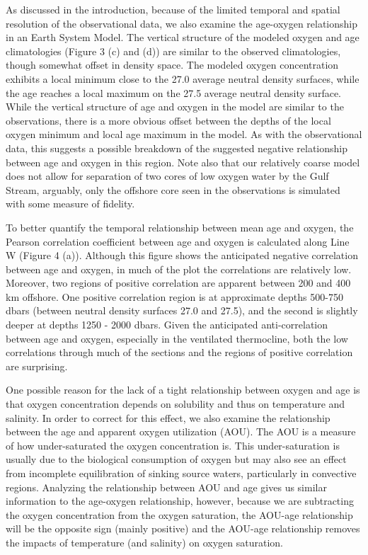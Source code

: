 As discussed in the introduction, because of the limited temporal and spatial resolution of the observational data, we also examine the age-oxygen relationship in an Earth System Model. The vertical structure of the modeled oxygen and age climatologies (Figure 3 (c) and (d)) are similar to the observed climatologies, though somewhat offset in density space. The modeled oxygen concentration exhibits a local minimum close to the 27.0 average neutral density surfaces, while the age reaches a local maximum on the 27.5 average neutral density surface. While the vertical structure of age and oxygen in the model are similar to the observations, there is a more obvious offset between the depths of the local oxygen minimum and local age maximum in the model. As with the observational data, this suggests a possible breakdown of the suggested negative relationship between age and oxygen in this region. Note also that our relatively coarse model does not allow for separation of two cores of low oxygen water by the Gulf Stream, arguably, only the offshore core seen in the observations is simulated with some measure of fidelity.

To better quantify the temporal relationship between mean age and oxygen, the Pearson correlation coefficient between age and oxygen is calculated along Line W (Figure 4 (a)).  Although this figure shows the anticipated negative correlation between age and oxygen, in much of the plot the correlations are relatively low.  Moreover, two regions of positive correlation are apparent between 200 and 400 km offshore. One positive correlation region is at approximate depths 500-750 dbars (between neutral density surfaces 27.0 and 27.5), and the second is slightly deeper at depths 1250 - 2000 dbars. Given the anticipated anti-correlation between age and oxygen, especially in the ventilated thermocline, both the low correlations through much of the sections and the regions of positive correlation are surprising.

One possible reason for the lack of a tight relationship between oxygen and age is that oxygen concentration depends on solubility and thus on temperature and salinity. In order to correct for this effect, we also examine the relationship between the age and apparent oxygen utilization (AOU). The AOU is a measure of how under-saturated the oxygen concentration is. This under-saturation is usually due to the biological consumption of oxygen but may also see an effect from incomplete equilibration of sinking source waters, particularly in convective regions. Analyzing the relationship between AOU and age gives us similar information to the age-oxygen relationship, however, because we are subtracting the oxygen concentration from the oxygen saturation, the AOU-age relationship will be the opposite sign (mainly positive) and the AOU-age relationship removes the impacts of temperature (and salinity) on oxygen saturation.

